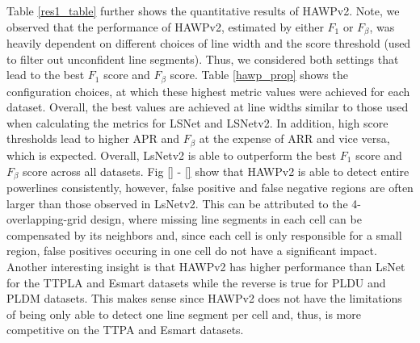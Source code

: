 \documentclass[journal]{IEEEtran}
\begin{document}
Table \ref{res1_table} further shows the quantitative results of HAWPv2. Note, we observed that the performance of HAWPv2, estimated by either $F_1$ or $F_\beta$, was heavily dependent on different choices of line width and the score threshold (used to filter out unconfident line segments). Thus, we considered both settings that lead to the best $F_1$ score and $F_\beta$ score. Table \ref{hawp_prop} shows the configuration choices, at which these highest metric values were achieved for each dataset. Overall, the best values are achieved at line widths similar to those used when calculating the metrics for LSNet and LSNetv2. In addition, high score thresholds lead to higher APR and $F_\beta$ at the expense of ARR and vice versa, which is expected. Overall, LsNetv2 is able to outperform the best $F_1$ score and $F_\beta$ score across all datasets. Fig \ref{} - \ref{} show that HAWPv2 is able to detect entire powerlines consistently, however, false positive and false negative regions are often larger than those observed in LsNetv2. This can be attributed to the 4-overlapping-grid design, where missing line segments in each cell can be compensated by its neighbors and, since each cell is only responsible for a small region, false positives occuring in one cell do not have a significant impact. Another interesting insight is that HAWPv2 has higher performance than LsNet for the TTPLA and Esmart datasets while the reverse is true for PLDU and PLDM datasets. This makes sense since HAWPv2 does not have the limitations of being only able to detect one line segment per cell and, thus, is more competitive on the TTPA and Esmart datasets.
\end{document}
